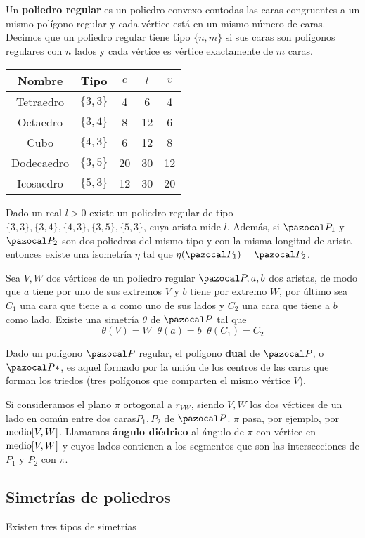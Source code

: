  Un \textbf{poliedro regular} es un poliedro convexo contodas las caras congruentes a un mismo polígono regular y cada vértice está en un mismo número de caras. Decimos que un poliedro regular tiene tipo $\{n, m\}$ si sus caras son polígonos regulares con $n$ lados y cada vértice es vértice exactamente de $m$ caras.

\begin{tabular}{ccccc}
	Nombre & Tipo & $c$ & $l$ & $v$ \\\midrule
	Tetraedro & $\{3,3\} $& 4 & 6 & 4 \\
	Octaedro & $\{3,4\}$ & 8 & 12 & 6 \\
	Cubo & $\{4,3\}$ & 6 & 12 & 8 \\
	Dodecaedro & $\{3,5\}$ & 20 & 30 & 12 \\
	Icosaedro & $\{5,3\}$ & 12 & 30 & 20 \\
\end{tabular}

 Dado un real $l>0$ existe un poliedro regular de tipo $\{3,3\},\{3,4\},\{4,3\},\{3,5\},\{5,3\}$, cuya arista mide $l$. Además, si $\PP_1$ y $\PP_2$ son dos poliedros del mismo tipo y con la misma longitud de arista entonces existe una isometría $\eta$ tal que $\eta(\PP_1) = \PP_2$.

 Sea $V, W$ dos vértices de un poliedro regular $\PP, a, b$ dos aristas, de modo que $a$ tiene por uno de sus extremos $V$ y $b$ tiene por extremo $W$, por último sea $C_1$ una cara que tiene a $a$ como uno de sus lados y $C_2$ una cara que tiene a $b$ como lado. Existe una simetría $\theta$ de $\PP$ tal que
\[\theta(V) = W \;\; \theta(a)=b \;\; \theta(C_1) = C_2  \]

 Dado un polígono $\PP$ regular, el polígono \textbf{dual} de $\PP$, o $\PP*$, es aquel formado por la unión de los centros de las caras que forman los triedos (tres polígonos que comparten el mismo vértice $V$).

 Si consideramos el plano $\pi$ ortogonal a $r_{VW}$, siendo $V,W$ los dos vértices de un lado en común entre dos caras$P_1, P_2$ de $\PP$. $\pi$ pasa, por ejemplo, por $\text{medio}[V,W]$. Llamamos \textbf{ángulo diédrico} al ángulo de $\pi$ con vértice en $\text{medio}[V,W]$ y cuyos lados contienen a los segmentos que son las intersecciones de $P_1$ y $P_2$ con $\pi$.

\subsection{Simetrías de poliedros}
Existen tres tipos de simetrías

